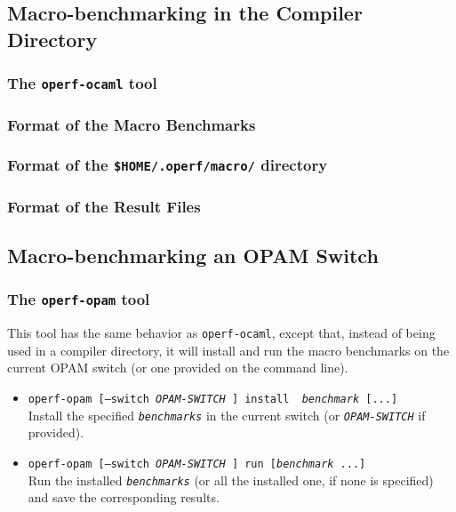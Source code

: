 \documentclass[11pt,a4paper]{article}
\begin{document}
\subsection{Macro-benchmarking in the Compiler Directory}

\subsubsection{The {\tt operf-ocaml} tool}

\subsubsection{Format of the Macro Benchmarks}

\subsubsection{Format of the {\tt \$HOME/.operf/macro/} directory}

\subsubsection{Format of the Result Files}

\subsection{Macro-benchmarking an OPAM Switch}

\subsubsection{The {\tt operf-opam} tool}

This tool has the same behavior as {\tt operf-ocaml}, except that,
instead of being used in a compiler directory, it will install and run
the macro benchmarks on the current OPAM switch (or one provided on
the command line).

\begin{itemize}
\item {\tt operf-opam [--switch {\em OPAM-SWITCH} ] install {\em
    benchmark} [...]}\\ Install the specified {\tt\em benchmarks} in
  the current switch (or {\tt\em OPAM-SWITCH} if provided).
\item {\tt operf-opam [--switch {\em OPAM-SWITCH} ] run [{\em benchmark} ...]}\\
  Run the installed {\tt\em benchmarks} (or all the installed one, if none
  is specified) and save the corresponding results.
\end{itemize}
\end{document}
